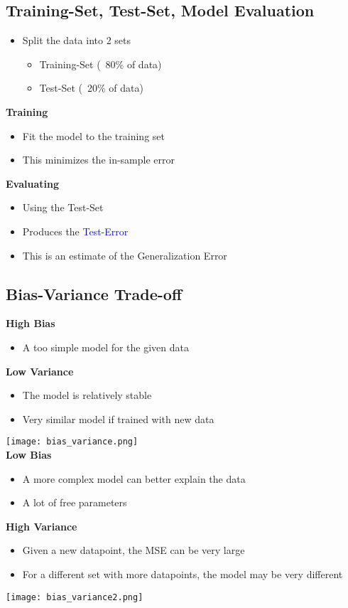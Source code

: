 \subsection{Training-Set, Test-Set, Model Evaluation}
\begin{itemize}
    \item Split the data into 2 sets
    \begin{itemize}
        \item Training-Set (~80\% of data)
        \item Test-Set (~20\% of data)
    \end{itemize}
\end{itemize}
\vspace{10pt}
\textbf{Training}
\begin{itemize}
    \item Fit the model to the training set
    \item This minimizes the in-sample error
\end{itemize}
\vspace{10pt}
\textbf{Evaluating}
\begin{itemize}
    \item Using the Test-Set
    \item Produces the \textcolor{blue}{Test-Error}
    \item This is an estimate of the Generalization Error
\end{itemize}

\subsection{Bias-Variance Trade-off}

\textbf{High Bias}
\begin{itemize}
    \item A too simple model for the given data
\end{itemize}
\vspace{10pt}
\textbf{Low Variance}
\begin{itemize}
    \item The model is relatively stable
    \item Very similar model if trained with new data
\end{itemize}
\texttt{[image: bias\_variance.png]}\\

\textbf{Low Bias}
\begin{itemize}
    \item A more complex model can better explain the data
    \item A lot of free parameters
\end{itemize}
\vspace{10pt}
\textbf{High Variance}
\begin{itemize}
    \item Given a new datapoint, the MSE can be very large
    \item For a different set with more datapoints, the model may be very different
\end{itemize}
\texttt{[image: bias\_variance2.png]}

